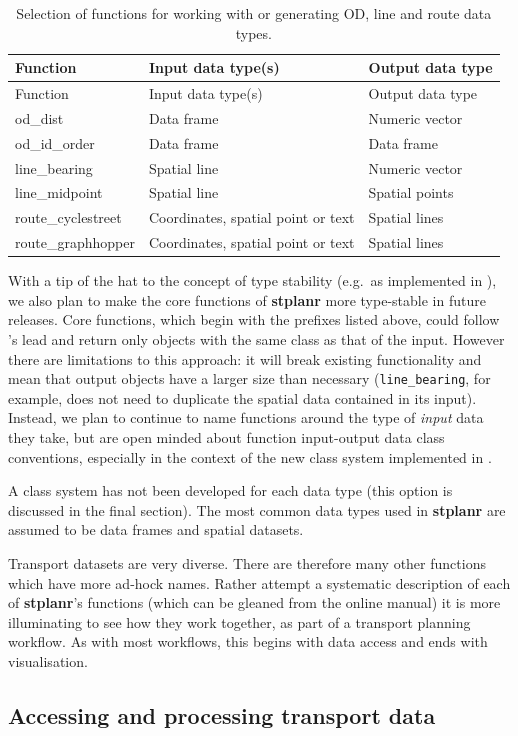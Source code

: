 \begin{longtable}[]{@{}lll@{}}
\caption{Selection of functions for working with or generating OD, line
and route data types.}\tabularnewline
\toprule
Function & Input data type(s) & Output data type\tabularnewline
\midrule
\endfirsthead
\toprule
Function & Input data type(s) & Output data type\tabularnewline
\midrule
\endhead
od\_dist & Data frame & Numeric vector\tabularnewline
od\_id\_order & Data frame & Data frame\tabularnewline
line\_bearing & Spatial line & Numeric vector\tabularnewline
line\_midpoint & Spatial line & Spatial points\tabularnewline
route\_cyclestreet & Coordinates, spatial point or text & Spatial
lines\tabularnewline
route\_graphhopper & Coordinates, spatial point or text & Spatial
lines\tabularnewline
\bottomrule
\end{longtable}

With a tip of the hat to the concept of type stability (e.g.~as
implemented in ), we also plan to make the core functions
of \textbf{stplanr} more type-stable in future releases. Core functions,
which begin with the prefixes listed above, could follow
's lead and return only objects with the same class as
that of the input. However there are limitations to this approach: it
will break existing functionality and mean that output objects have a
larger size than necessary (\texttt{line\_bearing}, for example, does
not need to duplicate the spatial data contained in its input). Instead,
we plan to continue to name functions around the type of \emph{input}
data they take, but are open minded about function input-output data
class conventions, especially in the context of the new class system
implemented in .

A class system has not been developed for each data type (this option is
discussed in the final section). The most common data types used in
\textbf{stplanr} are assumed to be data frames and spatial datasets.

Transport datasets are very diverse. There are therefore many other
functions which have more ad-hock names. Rather attempt a systematic
description of each of \textbf{stplanr}'s functions (which can be
gleaned from the online manual) it is more illuminating to see how they
work together, as part of a transport planning workflow. As with most
workflows, this begins with data access and ends with visualisation.

\subsection{Accessing and processing transport
data}\label{accessing-and-processing-transport-data}

